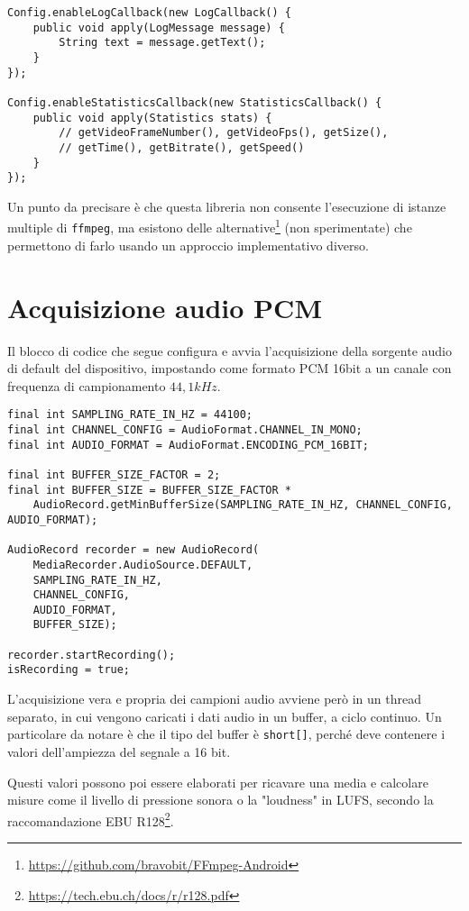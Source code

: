 \begin{verbatim}
Config.enableLogCallback(new LogCallback() {
    public void apply(LogMessage message) {
        String text = message.getText();
    }
});

Config.enableStatisticsCallback(new StatisticsCallback() {
    public void apply(Statistics stats) {
        // getVideoFrameNumber(), getVideoFps(), getSize(),
        // getTime(), getBitrate(), getSpeed()
    }
});
\end{verbatim}

Un punto da precisare è che questa libreria non consente l'esecuzione di istanze multiple di \texttt{ffmpeg}, ma esistono delle alternative\footnote{\url{https://github.com/bravobit/FFmpeg-Android}} (non sperimentate) che permettono di farlo usando un approccio implementativo diverso.

\chapter{Acquisizione audio PCM}
\label{cha:allegato_pcm}

Il blocco di codice che segue configura e avvia l'acquisizione della sorgente audio di default del dispositivo, impostando come formato PCM 16bit a un canale con frequenza di campionamento $44,1 kHz$.

\begin{verbatim}
final int SAMPLING_RATE_IN_HZ = 44100;
final int CHANNEL_CONFIG = AudioFormat.CHANNEL_IN_MONO;
final int AUDIO_FORMAT = AudioFormat.ENCODING_PCM_16BIT;

final int BUFFER_SIZE_FACTOR = 2;
final int BUFFER_SIZE = BUFFER_SIZE_FACTOR *
    AudioRecord.getMinBufferSize(SAMPLING_RATE_IN_HZ, CHANNEL_CONFIG, AUDIO_FORMAT);

AudioRecord recorder = new AudioRecord(
    MediaRecorder.AudioSource.DEFAULT,
    SAMPLING_RATE_IN_HZ,
    CHANNEL_CONFIG,
    AUDIO_FORMAT,
    BUFFER_SIZE);

recorder.startRecording();
isRecording = true;
\end{verbatim}

L'acquisizione vera e propria dei campioni audio avviene però in un thread separato, in cui vengono caricati i dati audio in un buffer, a ciclo continuo. Un particolare da notare è che il tipo del buffer è \texttt{short[]}, perché deve contenere i valori dell'ampiezza del segnale a 16 bit.

Questi valori possono poi essere elaborati per ricavare una media e calcolare misure come il livello di pressione sonora o la "loudness" in LUFS, secondo la raccomandazione EBU R128\footnote{\url{https://tech.ebu.ch/docs/r/r128.pdf}}.

